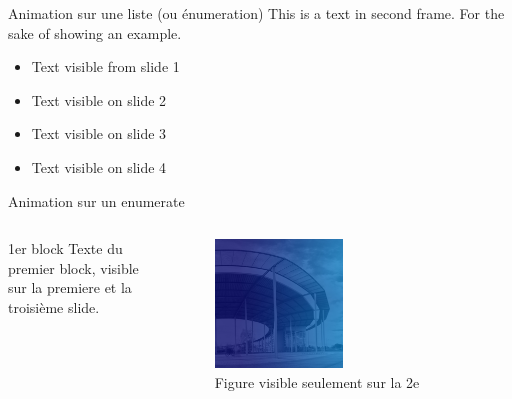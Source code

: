 \begin{frame}{Animation sur une liste (ou énumeration)}
    This is a text in second frame. 
    For the sake of showing an example.
    
    \begin{itemize}
     \item<1-> Text visible from slide 1
     \item<2-> Text visible on slide 2
     \item<3> Text visible on slide 3
     \item<4-> Text visible on slide 4
    \end{itemize}
\end{frame}

\begin{frame}{Animation sur un enumerate}
    \begin{columns}
        \begin{column}{0.45\textwidth}

            \begin{block}{1er block}
                Texte du premier block, visible sur la premiere et la troisième slide.
                
            \end{block}
            
        \end{column}
        \begin{column}{0.45\textwidth}
            \begin{figure}
                \centering
                \includegraphics[width=0.5\textwidth]{assets/imgs/img_utt.png}
                \caption{Figure visible seulement sur la 2e}
            \end{figure}  
            
        \end{column}
    \end{columns}
\end{frame}